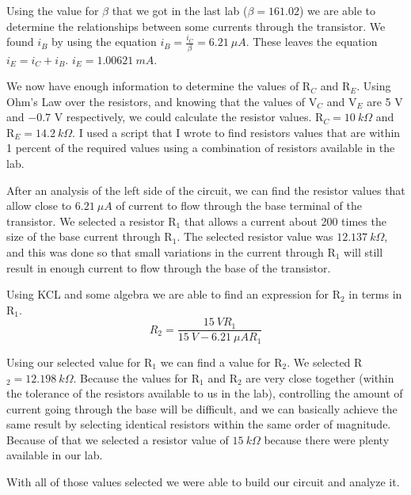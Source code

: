 \documentclass{article}
\begin{document}
Using the value for $\beta$ that we got in the last lab
($\beta=161.02$) we are able to determine the relationships
between some currents through the transistor. We found
$i_B$ by using the equation $i_B=\frac{i_C}{\beta}=\SI{6.21}{\mu A}$.
These leaves the equation $i_E=i_C + i_B$. $i_E=\SI{1.00621}{mA}$.

We now have enough information to determine the values
of R$_C$ and R$_E$. Using Ohm's Law over the resistors,
and knowing that the values of V$_C$ and V$_E$ are
5 V and $-0.7$ V respectively, we could calculate the
resistor values. R$_C=\SI{10}{k \Omega}$ and R$_E=\SI{14.2}{k
\Omega}$.  I used a script that I wrote to find resistors
values that are within 1 percent of the required values
using a combination of resistors available in the lab.

After an analysis of the left side of the circuit,
we can find the resistor values that allow close to
$\SI{6.21}{\mu A}$ of current to flow through the base
terminal of the transistor.  We selected a resistor
R$_1$ that allows a current about 200 times the size
of the base current through R$_1$.  The selected resistor
value was $\SI{12.137}{k \Omega}$, and this was done
so that small variations in the current through R$_1$
will still result in enough current to flow through
the base of the transistor.

Using KCL and some algebra we are able to find an
expression for R$_2$ in terms in R$_1$. 
$$R_2=\frac{\SI{15}{V} R_1}{\SI{15}{V} - \SI{6.21}{\mu A} R_1}$$

Using our selected value for R$_1$ we can find a value
for R$_2$.  We selected R$_2=\SI{12.198}{k \Omega}$.
Because the values for R$_1$ and R$_2$ are very close
together (within the tolerance of the resistors available
to us in the lab), controlling the amount of current
going through the base will be difficult, and we can
basically achieve the same result by selecting identical
resistors within the same order of magnitude. Because
of that we selected a resistor value of $\SI{15}{k \Omega}$
because there were plenty available in our lab.

With all of those values selected we were able to build
our circuit and analyze it.
\end{document}

